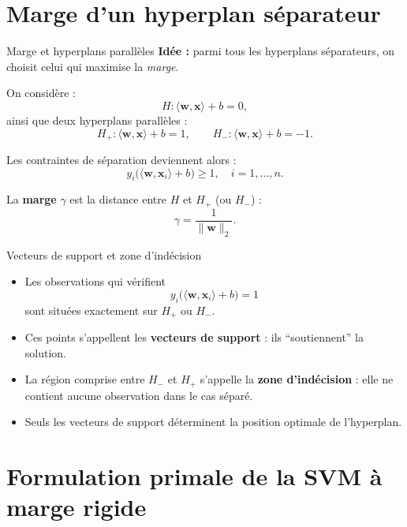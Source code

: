 \documentclass[aspectratio=169]{beamer}
\begin{document}
\section{Marge d'un hyperplan séparateur}

\begin{frame}{Marge et hyperplans parallèles}
  \textbf{Idée :} parmi tous les hyperplans séparateurs, on choisit celui qui maximise la \emph{marge}.

  \vspace{0.3cm}
  On considère :
  \[
    H : \langle \bm{w}, \bm{x} \rangle + b = 0,
  \]
  ainsi que deux hyperplans parallèles :
  \[
    H_+ : \langle \bm{w}, \bm{x} \rangle + b = 1, \qquad
    H_- : \langle \bm{w}, \bm{x} \rangle + b = -1.
  \]

  \vspace{0.3cm}
  Les contraintes de séparation deviennent alors :
  \[
    y_i \bigl( \langle \bm{w}, \bm{x}_i \rangle + b \bigr) \geq 1, \quad i=1,\dots,n.
  \]

  \vspace{0.3cm}
  La \textbf{marge} $\gamma$ est la distance entre $H$ et $H_+$ (ou $H_-$) :
  \[
    \gamma = \frac{1}{\|\bm{w}\|_2}.
  \]
\end{frame}

\begin{frame}{Vecteurs de support et zone d'indécision}
  \begin{itemize}
    \item Les observations qui vérifient
      \[
        y_i \bigl( \langle \bm{w}, \bm{x}_i \rangle + b \bigr) = 1
      \]
      sont situées exactement sur $H_+$ ou $H_-$.
    \item Ces points s'appellent les \textbf{vecteurs de support} : ils ``soutiennent'' la solution.
    \item La région comprise entre $H_-$ et $H_+$ s'appelle la \textbf{zone d'indécision} : elle ne contient
          aucune observation dans le cas séparé.
    \item Seuls les vecteurs de support déterminent la position optimale de l'hyperplan.
  \end{itemize}
\end{frame}

\section{Formulation primale de la SVM à marge rigide}
\end{document}
